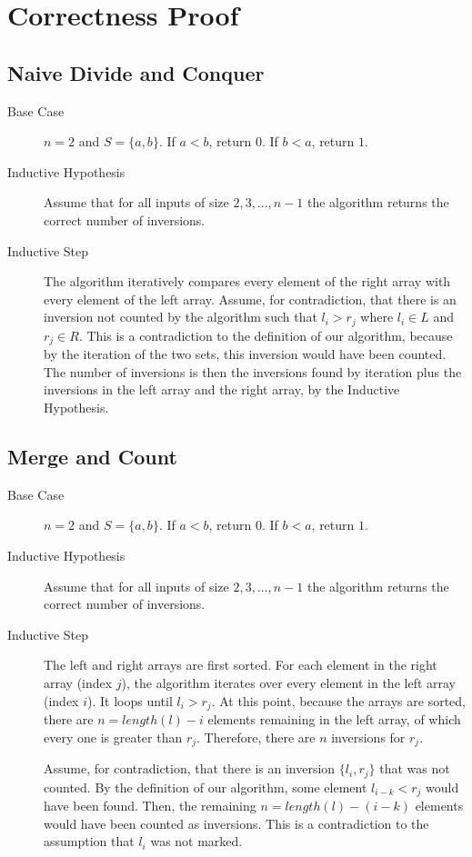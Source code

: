 \documentclass[12pt,letterpaper]{article}
\begin{document}
\section{Correctness Proof}
\subsection{Naive Divide and Conquer}
\begin{description}
  \item[Base Case] $n=2$ and $S = \{a, b\}$. If $a < b$, return $0$. If $b < a$,
    return $1$.
  \item[Inductive Hypothesis] Assume that for all inputs of size $2, 3,
    ... , n-1$ the algorithm returns the correct number of inversions.
  \item[Inductive Step] The algorithm iteratively compares every element of the
    right array with every element of the left array. Assume, for contradiction,
    that there is an inversion not counted by the algorithm such that $l_i >
    r_j$ where $l_i \in L$ and $r_j \in R$. This is a contradiction to the
    definition of our algorithm, because by the iteration of the two sets, this
    inversion would have been counted. The number of inversions is then the
    inversions found by iteration plus the inversions in the left array and the
    right array, by the Inductive Hypothesis.
\end{description}

\subsection{Merge and Count}
\begin{description}
  \item[Base Case] $n=2$ and $S = \{a, b\}$. If $a < b$, return $0$. If $b < a$,
    return $1$.
  \item[Inductive Hypothesis] Assume that for all inputs of size $2, 3,
    ... , n-1$ the algorithm returns the correct number of inversions.
  \item[Inductive Step] The left and right arrays are first sorted. For each
    element in the right array (index $j$), the algorithm iterates over every
    element in the left array (index $i$). It loops until $l_i > r_j$. At
    this point, because the arrays are sorted, there are $n = length(l) - i$
    elements remaining in the left array, of which every one is greater than
    $r_j$. Therefore, there are $n$ inversions for $r_j$.

    Assume, for contradiction, that there is an inversion $\{l_i, r_j\}$ that
    was not counted. By the definition of our algorithm, some element $l_{i-k} <
    r_j$ would have been found. Then, the remaining $n = length(l) - (i - k)$
    elements would have been counted as inversions. This is a contradiction to
    the assumption that $l_i$ was not marked.
\end{description}
\end{document}
